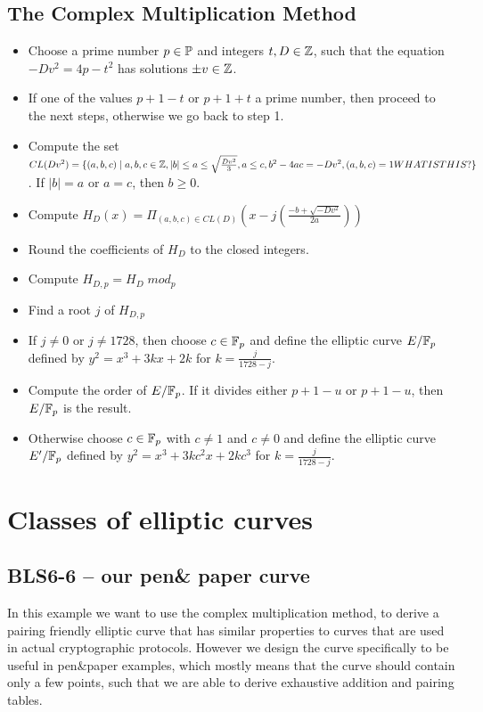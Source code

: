 \subsection{The Complex Multiplication Method}
\begin{itemize}
\item Choose a prime number $p\in\mathbb{P}$ and integers $t,D\in\mathbb{Z}$, such that the equation $-Dv^2 = 4p - t^2$ has solutions $\pm v \in \mathbb{Z}$.
\item If one of the values $p+1-t$ or $p+1+t$ a prime number, then proceed to the next steps, otherwise we go back to step 1.
\item Compute the set $CL(Dv^2)=\{(a,b,c)\;|\; a,b,c\in\mathbb{Z}, |b|\leq a \leq \sqrt{\frac{Dv^2}{3}},a\leq c, b^2-4ac=-Dv^2, (a,b,c)=1WHATISTHIS?\}$. If $|b|=a$ or $a=c$, then $b\geq 0$.
\item Compute $H_D(x)=\Pi_{(a,b,c)\in CL(D)} (x-j(\frac{-b+\sqrt{-Dv^2}}{2a}))$
\item Round the coefficients of $H_D$ to the closed integers.
\item Compute $H_{D,p} =H_D \; mod_p$
\item Find a root $j$ of $H_{D,p}$ 
\item If $j\neq 0$ or $j\neq 1728$, then choose $c\in \mathbb{F}_p$ and define the elliptic curve $E/\mathbb{F}_p$ defined by $y^2 = x^3 + 3kx+2k$ for $k= \frac{j}{1728-j}$.
\item Compute the order of $E/\mathbb{F}_p$. If it divides either $p+1-u$ or $p+1-u$, then $E/\mathbb{F}_p$ is the result.
\item Otherwise choose $c\in \mathbb{F}_p$ with $c\neq 1$ and $c\neq 0$ and define the elliptic curve $E'/\mathbb{F}_p$ defined by $y^2 = x^3 + 3kc^2x+2kc^3$ for $k= \frac{j}{1728-j}$.
\end{itemize}
\section{Classes of elliptic curves}
\subsection{BLS6-6 -- our pen\& paper curve}
In this example we want to use the complex multiplication method, to derive a pairing friendly elliptic curve that has similar properties to curves that are used in actual cryptographic protocols. However we design the curve specifically to be useful in pen\&{}paper examples, which mostly means that the curve should contain only a few points, such that we are able to derive exhaustive addition and pairing tables.

